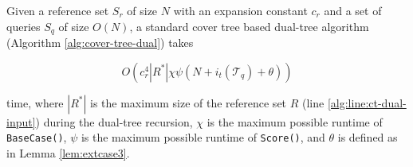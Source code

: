 \begin{thm}
\label{thm:ct-runtime}
Given a reference set $S_r$ of size $N$ with an expansion constant $c_r$ and a
set of queries $S_q$ of size $O(N)$, a standard cover tree based dual-tree
algorithm (Algorithm \ref{alg:cover-tree-dual}) takes

\begin{equation}
O\left(c_r^4 | R^* | \chi \psi (N + i_t(\mathscr{T}_q) + \theta)\right)
\end{equation}

\noindent time, where $ | R^* | $ is the maximum size of the reference set $R$
(line \ref{alg:line:ct-dual-input}) during the dual-tree recursion, $\chi$ is
the maximum possible runtime of \texttt{BaseCase()}, $\psi$ is the maximum
possible runtime of \texttt{Score()}, and $\theta$ is defined as in Lemma
\ref{lem:extcase3}.
\end{thm}


